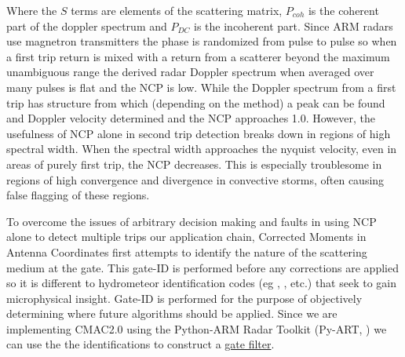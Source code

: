 \documentclass[twocol]{ametsoc}
\begin{document}
Where the $S$ terms are elements of the scattering matrix, $P_{coh}$ is the coherent part of the doppler spectrum and $P_{DC}$ is the incoherent part.
 Since ARM radars use magnetron transmitters the phase is randomized from pulse to pulse so when a first trip return is mixed with a return from a scatterer
  beyond the maximum unambiguous range the derived radar Doppler spectrum when averaged over many pulses is flat and the NCP is low. While the 
  Doppler spectrum from a first trip has structure from which (depending on the method) a peak can be found and Doppler velocity determined and the NCP
   approaches 1.0. However, the usefulness of NCP alone in second trip detection breaks down in regions of high spectral width. When the spectral width
    approaches the nyquist velocity, even in areas of purely first trip, the NCP decreases. This is especially troublesome in regions of high convergence 
    and divergence in convective storms, often causing false flagging of these regions. 

To overcome the issues of arbitrary decision making and faults in using NCP alone to detect multiple trips our application chain, Corrected Moments in
 Antenna Coordinates first attempts to identify the nature of the scattering medium at the gate. This gate-ID is performed before any corrections are
  applied so it is different to hydrometeor identification codes (eg \cite{dolan_theory-based_2009}, \cite{wen_cluster-based_2015}, \cite{al-sakka_new_2013} etc.) 
  that seek to gain microphysical insight. Gate-ID is performed for the purpose of objectively determining where future algorithms should be applied. 
  Since we are implementing CMAC2.0 using the Python-ARM Radar Toolkit (Py-ART, \cite{heistermann_emergence_2014}) we can use the the
   identifications to construct a \href{https://github.com/ARM-DOE/pyart/blob/master/pyart/filters/gatefilter.py#L111 }{gate filter}.
\end{document}
